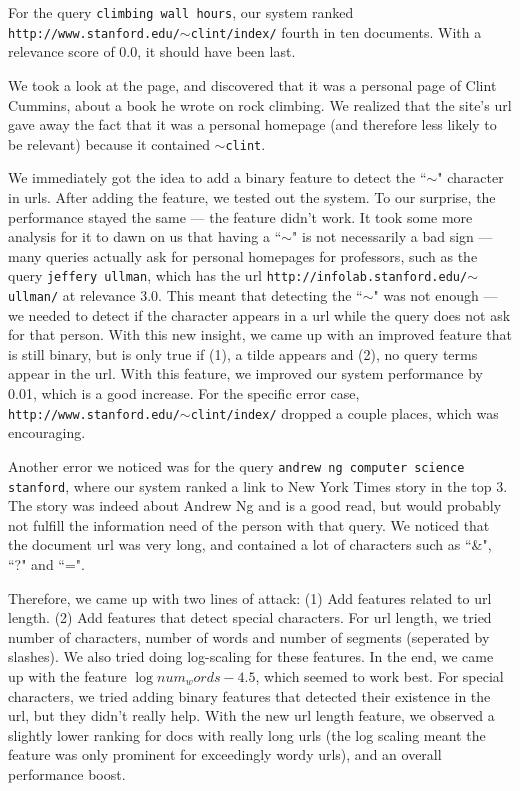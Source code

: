 \documentclass[10pt,twocolumn]{article}
\begin{document}
For the query \texttt{climbing wall hours}, our system ranked \texttt{http://www.stanford.edu/$\sim$clint/index/} fourth in ten documents. With a relevance score of 0.0, it should have been last.

We took a look at the page, and discovered that it was a personal page of Clint Cummins, about a book he wrote on rock climbing. We realized that the site's url gave away the fact that it was a personal homepage (and therefore less likely to be relevant) because it contained \texttt{$\sim$clint}.

We immediately got the idea to add a binary feature to detect the ``$\sim$" character in urls. After adding the feature, we tested out the system. To our surprise, the performance stayed the same --- the feature didn't work. It took some more analysis for it to dawn on us that having a ``$\sim$" is not necessarily a bad sign --- many queries actually ask for personal homepages for professors, such as the query \texttt{jeffery ullman}, which has the url \texttt{http://infolab.stanford.edu/$\sim$ullman/} at relevance 3.0. This meant that detecting the ``$\sim$" was not enough --- we needed to detect if the character appears in a url while the query does not ask for that person. With this new insight, we came up with an improved feature that is still binary, but is only true if (1), a tilde appears and (2), no query terms appear in the url. With this feature, we improved our system performance by 0.01, which is a good increase. For the specific error case, \texttt{http://www.stanford.edu/$\sim$clint/index/} dropped a couple places, which was encouraging. 

Another error we noticed was for the query \texttt{andrew ng computer science stanford}, where our system ranked a link to New York Times story in the top 3. The story was indeed about Andrew Ng and is a good read, but would probably not fulfill the information need of the person with that query. We noticed that the document url was very long, and contained a lot of characters such as ``\&", ``?" and ``=".

Therefore, we came up with two lines of attack: (1) Add features related to url length. (2) Add features that detect special characters. For url length, we tried number of characters, number of words and number of segments (seperated by slashes). We also tried doing log-scaling for these features. In the end, we came up with the feature $\log{num_words-4.5}$, which seemed to work best. For special characters, we tried adding binary features that detected their existence in the url, but they didn't really help. With the new url length feature, we observed a slightly lower ranking for docs with really long urls (the log scaling meant the feature was only prominent for exceedingly wordy urls), and an overall performance boost.
\end{document}
